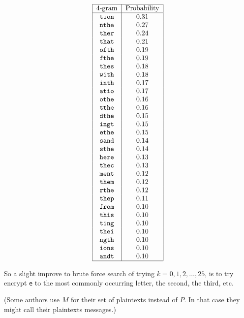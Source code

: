 \[
 \begin{tabular}{|c|c|}
   \hline
   4-gram & Probability \\
   \hline
\texttt{tion} &  0.31\\        
\texttt{nthe} &  0.27\\        
\texttt{ther} &  0.24\\        
\texttt{that} &  0.21\\        
\texttt{ofth} &  0.19\\        
\texttt{fthe} &  0.19\\        
\texttt{thes} &  0.18\\        
\texttt{with} &  0.18\\        
\texttt{inth} &  0.17\\        
\texttt{atio} &  0.17\\        
\texttt{othe} &  0.16\\        
\texttt{tthe} &  0.16\\        
\texttt{dthe} &  0.15\\        
\texttt{ingt} &  0.15\\        
\texttt{ethe} &  0.15\\        
\texttt{sand} &  0.14\\        
\texttt{sthe} &  0.14\\        
\texttt{here} &  0.13\\        
\texttt{thec} &  0.13\\        
\texttt{ment} &  0.12\\        
\texttt{them} &  0.12\\
\texttt{rthe} &  0.12\\
\texttt{thep} &  0.11\\
\texttt{from} &  0.10\\
\texttt{this} &  0.10\\
\texttt{ting} &  0.10\\
\texttt{thei} &  0.10\\
\texttt{ngth} &  0.10\\
\texttt{ions} &  0.10\\
\texttt{andt} &  0.10\\
   \hline
 \end{tabular}
\]

So a slight improve to brute force search of trying
$k=0,1,2,\ldots,25$, is to try encrypt \texttt{e} to the most
commonly occurring letter, the second, the third, etc.

(Some authors use $M$ for their set of plaintexts instead of $P$.
In that case they might call their plaintexts messages.)



